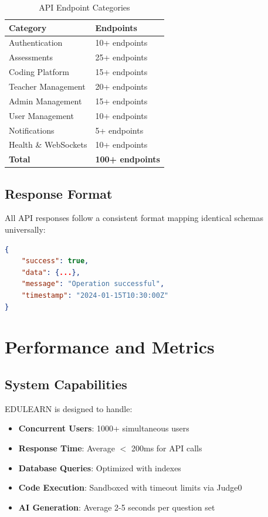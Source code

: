 \documentclass[conference]{IEEEtran}
\begin{document}
\begin{table}[ht]
    \centering
    \caption{API Endpoint Categories}
    \label{tab:endpoints}
    \begin{tabular}{@{}ll@{}}
        \toprule
        \textbf{Category} & \textbf{Endpoints} \\
        \midrule
        Authentication & 10+ endpoints \\
        Assessments & 25+ endpoints \\
        Coding Platform & 15+ endpoints \\
        Teacher Management & 20+ endpoints \\
        Admin Management & 15+ endpoints \\
        User Management & 10+ endpoints \\
        Notifications & 5+ endpoints \\
        Health \& WebSockets & 10+ endpoints \\
        \midrule
        \textbf{Total} & \textbf{100+ endpoints} \\
        \bottomrule
    \end{tabular}
\end{table}

\subsection{Response Format}
All API responses follow a consistent format mapping identical schemas universally:

\begin{lstlisting}[language=json, caption=Standard API Response]
{
    "success": true,
    "data": {...},
    "message": "Operation successful",
    "timestamp": "2024-01-15T10:30:00Z"
}
\end{lstlisting}

\section{Performance and Metrics}

\subsection{System Capabilities}
EDULEARN is designed to handle:
\begin{itemize}
    \item \textbf{Concurrent Users}: 1000+ simultaneous users
    \item \textbf{Response Time}: Average $<$ 200ms for API calls
    \item \textbf{Database Queries}: Optimized with indexes
    \item \textbf{Code Execution}: Sandboxed with timeout limits via Judge0
    \item \textbf{AI Generation}: Average 2-5 seconds per question set
\end{itemize}
\end{document}
